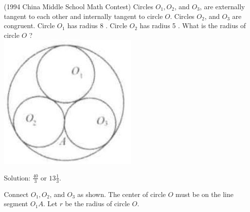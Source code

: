 \documentclass{article}
\begin{document}
(1994 China Middle School Math Contest) Circles \(O_{1}, O_{2}\), and \(O_{3}\), are externally tangent to each other and internally tangent to circle \(O\). Circles \(O_{2}\), and \(O_{3}\) are congruent. Circle \(O_{1}\) has radius 8 . Circle \(O_{2}\) has radius 5 . What is the radius of circle \(O\) ?\\
\centering
\includegraphics[width=\textwidth]{images/179.jpg}

Solution: \(\frac{40}{3}\) or \(13 \frac{1}{3}\).


Connect \(O_{1}, O_{2}\), and \(O_{3}\) as shown. The center of circle \(O\) must be on the line segment \(O_{1} A\). Let \(r\) be the radius of circle \(O\).
\end{document}
